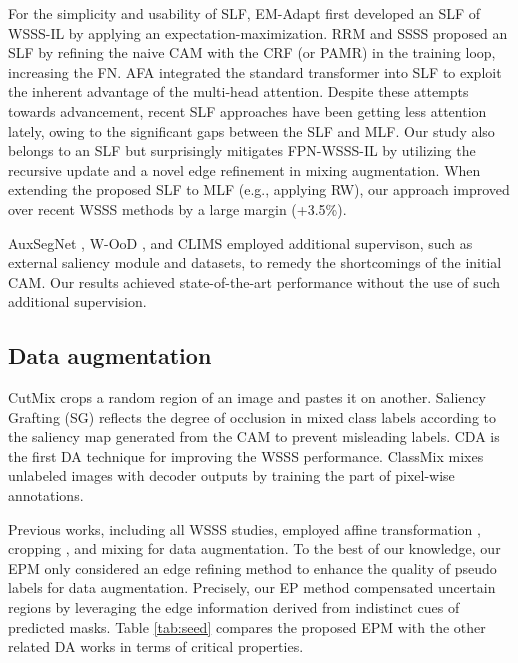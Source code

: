 \documentclass[11pt]{article}
\begin{document}
{For the simplicity and usability of SLF, EM-Adapt \cite{papandreou2015weakly} first developed an SLF of WSSS-IL by applying an expectation-maximization. RRM \cite{zhang2020reliability} and SSSS \cite{araslanov2020single} proposed an SLF by refining the naive CAM with the CRF (or PAMR) in the training loop, increasing the FN. AFA \cite{ru2022learning} integrated the standard transformer into SLF to exploit the inherent advantage of the multi-head attention. {Despite these attempts towards advancement}, recent SLF approaches \cite{zhang2020reliability, araslanov2020single, ru2022learning} have been getting less attention lately, owing to the significant gaps between the SLF and MLF.}
Our study also belongs to an SLF {but surprisingly mitigates FPN-WSSS-IL by utilizing the recursive update and a novel edge refinement in mixing augmentation. When extending the proposed SLF to MLF (e.g., applying RW), our approach improved over recent WSSS methods by a large margin (+3.5\%).}

{AuxSegNet \cite{xu2021leveraging}, W-OoD \cite{lee2022weakly}, and CLIMS \cite{xie2022clims} employed additional supervison, such as external saliency module and datasets, to remedy the shortcomings of the initial CAM. Our results achieved state-of-the-art performance without the use of such additional supervision.}



\subsection{Data augmentation}
{CutMix \cite{yun2019cutmix} crops a random region of an image and pastes it on another. Saliency Grafting (SG) \cite{park2021saliency} reflects the degree of occlusion in mixed class labels according to the saliency map generated from the CAM to prevent misleading labels. CDA \cite{su2021context} is the first DA technique for improving the WSSS performance. ClassMix \cite{olsson2021classmix} mixes unlabeled images with decoder outputs by training the part of pixel-wise annotations.}  



{Previous works, including all WSSS studies, employed affine transformation \cite{wang2020self, du2022weakly}, cropping \cite{jo2021puzzle, jiang2022l2g}, and mixing \cite{su2021context, olsson2021classmix} for data augmentation. To the best of our knowledge, our EPM only considered an edge refining method to enhance the quality of pseudo labels for data augmentation. Precisely, our EP method} compensated uncertain regions by leveraging the edge information derived from indistinct cues of predicted masks. Table \ref{tab:seed} compares the proposed EPM with the other related DA works in terms of critical properties.
\end{document}

